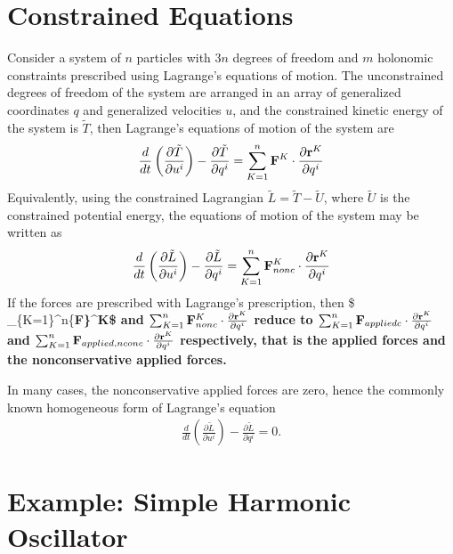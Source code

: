 \documentclass[
  letterpaper,
  DIV=11,
  numbers=noendperiod]{scrreprt}
\newcommand{\lp}{\left(}
\newcommand{\rp}{\right)}
\begin{document}
\section{Constrained Equations}\label{constrained-equations}

Consider a system of \(n\) particles with \(3n\) degrees of freedom and
\(m\) holonomic constraints prescribed using Lagrange's equations of
motion. The unconstrained degrees of freedom of the system are arranged
in an array of generalized coordinates \(q\) and generalized velocities
\(u\), and the constrained kinetic energy of the system is
\(\tilde{T}\), then Lagrange's equations of motion of the system are
\begin{align}
    \frac{d}{dt}\lp\frac{\partial \tilde{T}}{\partial u^i}\rp-\frac{\partial \tilde{T}}{\partial q^i} = \sum_{K=1}^n{\bf F}^K\cdot \frac{\partial {\bf r}^K}{\partial q^i}
\end{align} Equivalently, using the constrained Lagrangian
\(\tilde{L} = \tilde{T}-\tilde{U}\), where \(\tilde{U}\) is the
constrained potential energy, the equations of motion of the system may
be written as \begin{align}
    \frac{d}{dt}\lp\frac{\partial \tilde{L}}{\partial u^i}\rp-\frac{\partial \tilde{L}}{\partial q^i} = \sum_{K=1}^n{\bf F}_{nonc}^K\cdot \frac{\partial {\bf r}^K}{\partial q^i}
\end{align} If the forces are prescribed with Lagrange's prescription,
then \$
\sum\_\{K=1\}\^{}n\{\bf F\}\^{}K\cdot {}\$
and
\(\sum_{K=1}^n{\bf F}_{nonc}^K\cdot \frac{\partial {\bf r}^K}{\partial q^i}\)
reduce to
\(\sum_{K=1}^n{\bf F}_{appliedc}\cdot\frac{\partial {\bf r}^K}{\partial q^i}\)
and
\(\sum_{K=1}^n{\bf F}_{applied, nconc}\cdot\frac{\partial {\bf r}^K}{\partial q^i}\)
respectively, that is the applied forces and the nonconservative applied
forces.

In many cases, the nonconservative applied forces are zero, hence the
commonly known homogeneous form of Lagrange's equation \begin{align}
    \frac{d}{dt}\lp\frac{\partial \tilde{L}}{\partial u^i}\rp-\frac{\partial \tilde{L}}{\partial q^i} = 0.
\end{align}

\section{Example: Simple Harmonic
Oscillator}\label{example-simple-harmonic-oscillator}
\end{document}
